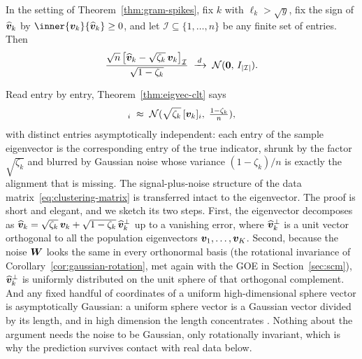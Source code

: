 \begin{theorem}\label{thm:eigvec-clt}
In the setting of Theorem~\ref{thm:gram-spikes}, fix \(k\) with \(\ell_k > \sqrt{y}\), fix the sign of \(\widehat{\bm{v}}_k\) by \(\inner{\vect{v}_k}{\widehat{\vect{v}}_k} \ge 0\), and let \(\mathcal{I} \subseteq \{1, \dots, n\}\) be any finite set of entries. Then
\[
  \frac{\sqrt{n}\, \bigl[\widehat{\bm{v}}_k - \sqrt{\zeta_k}\, \bm{v}_k\bigr]_{\mathcal{I}}}{\sqrt{1 - \zeta_k}}
  \;\xrightarrow{\,d\,}\; \mathcal{N}(\bm{0},\, I_{\lvert\mathcal{I}\rvert}).
\]
\end{theorem}

Read entry by entry, Theorem~\ref{thm:eigvec-clt} says
\begin{equation}
  [\widehat{\vect{v}}_k]_i \;\approx\; \Normal{\sqrt{\zeta_k}\, [\vect{v}_k]_i,\; \tfrac{1 - \zeta_k}{n}},
  \label{eq:entrywise}
\end{equation}
with distinct entries asymptotically independent: each entry of the sample eigenvector is the corresponding entry of the true indicator, shrunk by the factor \(\sqrt{\zeta_k}\) and blurred by Gaussian noise whose variance \((1 - \zeta_k)/n\) is exactly the alignment that is missing. The signal-plus-noise structure of the data matrix~\eqref{eq:clustering-matrix} is transferred intact to the eigenvector. The proof is short and elegant, and we sketch its two steps. First, the eigenvector decomposes as \(\widehat{\bm{v}}_k = \sqrt{\zeta_k}\, \bm{v}_k + \sqrt{1 - \zeta_k}\, \widehat{\bm{v}}_k^{\perp}\) up to a vanishing error, where \(\widehat{\bm{v}}_k^{\perp}\) is a unit vector orthogonal to all the population eigenvectors \(\bm{v}_1, \dots, \bm{v}_K\). Second, because the noise \(\bm{W}\) looks the same in every orthonormal basis (the rotational invariance of Corollary~\ref{cor:gaussian-rotation}, met again with the GOE in Section~\ref{sec:scm}), \(\widehat{\bm{v}}_k^{\perp}\) is uniformly distributed on the unit sphere of that orthogonal complement. And any fixed handful of coordinates of a uniform high-dimensional sphere vector is asymptotically Gaussian: a uniform sphere vector is a Gaussian vector divided by its length, and in high dimension the length concentrates \citep{Vershynin2018}. Nothing about the argument needs the noise to be Gaussian, only rotationally invariant, which is why the prediction survives contact with real data below.

